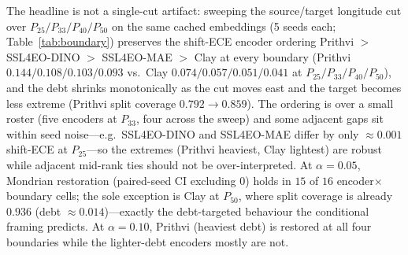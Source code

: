 \documentclass[11pt]{article}
\begin{document}
The headline is not a single-cut artifact: sweeping the source/target
longitude cut over $P_{25}/P_{33}/P_{40}/P_{50}$ on the same cached embeddings (5 seeds each;
Table~\ref{tab:boundary}) preserves the shift-ECE encoder ordering Prithvi $>$ SSL4EO-DINO $>$ SSL4EO-MAE
$>$ Clay at every boundary (Prithvi $0.144/0.108/0.103/0.093$ vs.\ Clay $0.074/0.057/0.051/0.041$ at
$P_{25}/P_{33}/P_{40}/P_{50}$), and the debt shrinks monotonically as the cut moves east and the target
becomes less extreme (Prithvi split coverage $0.792\to0.859$). The ordering is over a small roster (five
encoders at $P_{33}$, four across the sweep) and some adjacent gaps sit within seed noise---e.g.\ SSL4EO-DINO
and SSL4EO-MAE differ by only ${\approx}0.001$ shift-ECE at $P_{25}$---so the extremes (Prithvi heaviest, Clay
lightest) are robust while adjacent mid-rank ties should not be over-interpreted. At $\alpha=0.05$, Mondrian restoration
(paired-seed CI excluding $0$) holds in $15$ of $16$ encoder$\times$boundary cells; the sole exception is
Clay at $P_{50}$, where split coverage is already $0.936$ (debt ${\approx}0.014$)---exactly the
debt-targeted behaviour the conditional framing predicts. At $\alpha=0.10$, Prithvi (heaviest debt) is
restored at all four boundaries while the lighter-debt encoders mostly are not.
\end{document}

